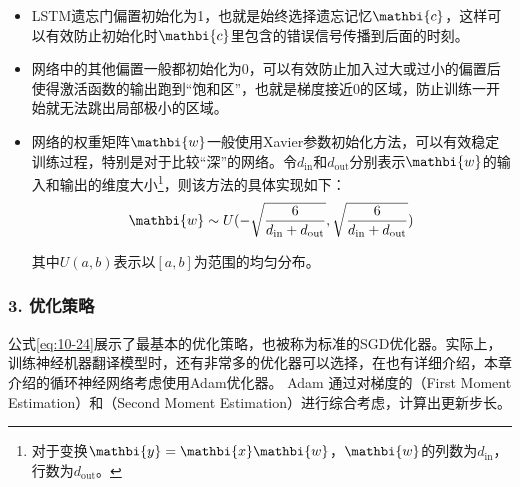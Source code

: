\begin{itemize}
\vspace{0.5em}
\item LSTM遗忘门偏置初始化为1，也就是始终选择遗忘记忆$\mathbi{c}$，这样可以有效防止初始化时$\mathbi{c}$里包含的错误信号传播到后面的时刻。
\vspace{0.5em}
\item 网络中的其他偏置一般都初始化为0，可以有效防止加入过大或过小的偏置后使得激活函数的输出跑到“饱和区”，也就是梯度接近0的区域，防止训练一开始就无法跳出局部极小的区域。
\vspace{0.5em}
\item 网络的权重矩阵$\mathbi{w}$一般使用Xavier参数初始化方法，可以有效稳定训练过程，特别是对于比较“深”的网络。令$d_{\textrm{in}}$和$d_{\textrm{out}}$分别表示$\mathbi{w}$的输入和输出的维度大小\footnote{对于变换$\mathbi{y} = \mathbi{x} \mathbi{w}$，$\mathbi{w}$的列数为$d_{\textrm{in}}$，行数为$d_{\textrm{out}}$。}，则该方法的具体实现如下：
\begin{eqnarray}
\mathbi{w} \sim U(-\sqrt{ \frac{6} { d_{\textrm{in}} + d_{\textrm{out}} } } , \sqrt{ \frac{6} { d_{\textrm{in}} + d_{\textrm{out}} } })
\label{eq:10-27}
\vspace{0.5em}
\end{eqnarray}

其中$U(a,b)$表示以$[a,b]$为范围的均匀分布。\\
\end{itemize}

\vspace{-2.5em}
\subsubsection{3. 优化策略}

\parinterval 公式\eqref{eq:10-24}展示了最基本的优化策略，也被称为标准的SGD优化器。实际上，训练神经机器翻译模型时，还有非常多的优化器可以选择，在{\chapternine}也有详细介绍，本章介绍的循环神经网络考虑使用Adam优化器。 Adam 通过对梯度的{\small{}}（First Moment Estimation）和{\small{}}（Second Moment Estimation）进行综合考虑，计算出更新步长。

